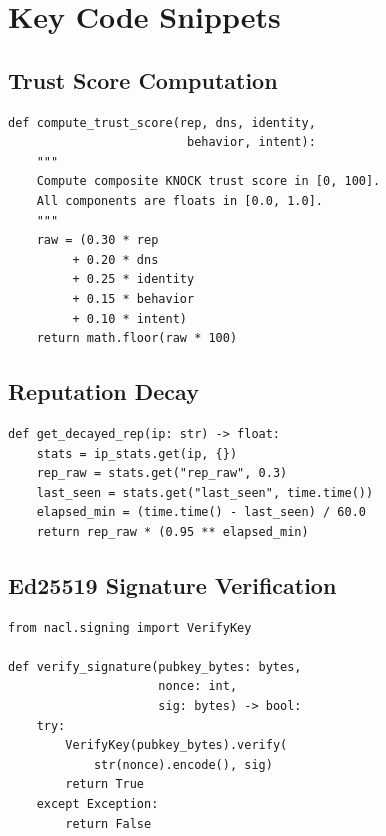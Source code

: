 \documentclass[10pt,conference]{IEEEtran}
\begin{document}
\section{Key Code Snippets}
\label{app:code}

\subsection{Trust Score Computation}

\begin{lstlisting}[caption={Core trust-scoring function (knock.py).}]
def compute_trust_score(rep, dns, identity,
                         behavior, intent):
    """
    Compute composite KNOCK trust score in [0, 100].
    All components are floats in [0.0, 1.0].
    """
    raw = (0.30 * rep
         + 0.20 * dns
         + 0.25 * identity
         + 0.15 * behavior
         + 0.10 * intent)
    return math.floor(raw * 100)
\end{lstlisting}

\subsection{Reputation Decay}

\begin{lstlisting}[caption={Time-decayed reputation calculation.}]
def get_decayed_rep(ip: str) -> float:
    stats = ip_stats.get(ip, {})
    rep_raw = stats.get("rep_raw", 0.3)
    last_seen = stats.get("last_seen", time.time())
    elapsed_min = (time.time() - last_seen) / 60.0
    return rep_raw * (0.95 ** elapsed_min)
\end{lstlisting}

\subsection{Ed25519 Signature Verification}

\begin{lstlisting}[caption={Ed25519 signature verification (knock.py).}]
from nacl.signing import VerifyKey

def verify_signature(pubkey_bytes: bytes,
                     nonce: int,
                     sig: bytes) -> bool:
    try:
        VerifyKey(pubkey_bytes).verify(
            str(nonce).encode(), sig)
        return True
    except Exception:
        return False
\end{lstlisting}
\end{document}
